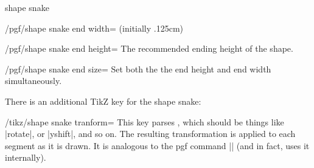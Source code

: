 \begin{snake}{shape snake}
\begin{key}{/pgf/shape snake end width= (initially .125cm)}
\end{key}%

\begin{key}{/pgf/shape snake end height=}
  The recommended ending height of the shape.
\end{key}%

\begin{stylekey}{/pgf/shape snake end size=}
  Set both the the end height and end width simultaneously.
\end{stylekey}

There is an additional TikZ key for the shape snake:

\begin{stylekey}{/tikz/shape snake tranform=}
  This key parses , which should be things like |rotate|, or
  |yshift|, and so on. The resulting transformation is applied to each 
  segment as it is drawn. It is analogous to the pgf command
  |\pgfsetsnakesegmenttransformation| (and in fact, uses it internally).

\begin{codeexample}[]
\end{codeexample}
\end{stylekey}

\end{snake}


